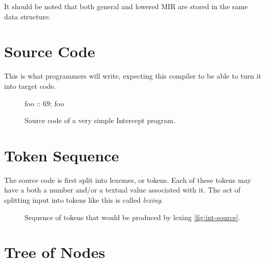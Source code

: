 \documentclass[12pt]{article}
\begin{document}
\noindent It should be noted that both general and lowered MIR are stored in the same data structure.

\section{Source Code}
\label{sec:source-code}

This is what programmers will write, expecting this compiler to be able to turn it into target code.

\begin{figure}[h]
  \centering
  foo :: 69; foo
  \caption{Source code of a very simple Intercept program.}
  \label{fig:int-source}
\end{figure}
\FloatBarrier

\section{Token Sequence}
\label{sec:tokens}

The source code is first split into lexemes, or tokens. Each of these tokens may have a both a number and/or a textual value associated with it. The act of splitting input into tokens like this is called \emph{lexing}.

\begin{figure}[h]
  \centering
  \caption{Sequence of tokens that would be produced by lexing \autoref{fig:int-source}.}
  \label{fig:int-tokens}
\end{figure}
\FloatBarrier

\section{Tree of Nodes}
\label{sec:node-tree}
\end{document}
